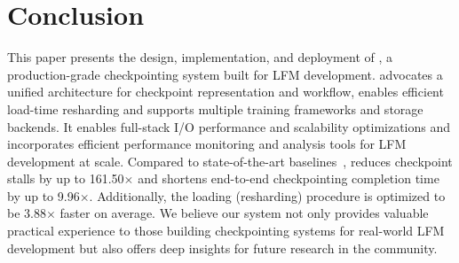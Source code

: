 \section{Conclusion}
This paper presents the design, implementation, and deployment of \sys{}, a production-grade checkpointing system built for LFM development. 
\sys{} advocates a unified architecture for %
checkpoint representation and workflow, enables efficient load-time  resharding and supports multiple training frameworks and storage backends.
It enables full-stack I/O performance and scalability optimizations and incorporates efficient performance monitoring and analysis tools for LFM development at scale.
Compared to state-of-the-art baselines~\cite{torch-dcp, megatron-dcp}, \sys{} %
reduces checkpoint stalls by up to 161.50$\times$ and shortens end-to-end checkpointing completion time by up to 9.96$\times$. Additionally, the loading (resharding) procedure is optimized to be 3.88$\times$ faster on average.
We believe our system not only provides valuable practical experience to those building checkpointing systems for real-world LFM development but also offers deep insights for future research in the community.


